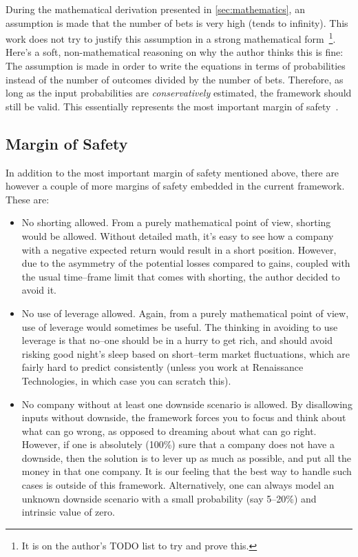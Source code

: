 \documentclass{article}
\begin{document}
During the mathematical derivation presented in \autoref{sec:mathematics}, an
assumption is made that the number of bets is very high (tends to infinity).
This work does not try to justify this assumption in a strong mathematical
form~\footnote{It is on the author's TODO list to try and prove this.}. Here's a
soft, non-mathematical reasoning on why the author thinks this is fine: The
assumption is made in order to write the equations in terms of probabilities
instead of the number of outcomes divided by the number of bets. Therefore, as
long as the input probabilities are \textit{conservatively} estimated, the
framework should still be valid. This essentially represents the most important
margin of safety~\cite{intelligentInvestor}.

\subsection{Margin of Safety}
\label{sec:safetyMargin}

In addition to the most important margin of safety mentioned above, there are
however a couple of more margins of safety embedded in the current framework.
These are:
\begin{itemize}
    \item No shorting allowed. From a purely mathematical point of view,
    shorting would be allowed. Without detailed math, it's easy to see how a
    company with a negative expected return would result in a short position.
    However, due to the asymmetry of the potential losses compared to gains,
    coupled with the usual time--frame limit that comes with shorting, the
    author decided to avoid it.
    \item No use of leverage allowed. Again, from a purely mathematical point of
    view, use of leverage would sometimes be useful. The thinking in avoiding to
    use leverage is that no--one should be in a hurry to get rich, and should
    avoid risking good night's sleep based on short--term market fluctuations,
    which are fairly hard to predict consistently (unless you work at
    Renaissance Technologies, in which case you can scratch this).
    \item No company without at least one downside scenario is allowed. By
    disallowing inputs without downside, the framework forces you to focus and
    think about what can go wrong, as opposed to dreaming about what can go
    right. However, if one is absolutely (100\%) sure that a company does not
    have a downside, then the solution is to lever up as much as possible, and
    put all the money in that one company. It is our feeling that the best way
    to handle such cases is outside of this framework. Alternatively, one can
    always model an unknown downside scenario with a small probability (say
    5--20\%) and intrinsic value of zero.
\end{itemize}
\end{document}
